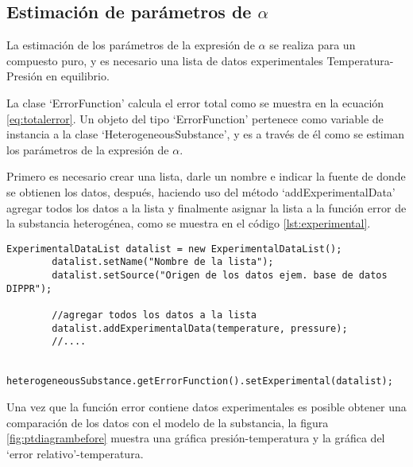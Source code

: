 \subsection{Estimación de parámetros de $\alpha$}\label{subsec:alphaoptim}
	La estimación de los parámetros de la expresión de $\alpha$ se realiza para un compuesto puro, y es necesario una lista de datos experimentales Temperatura-Presión en equilibrio. 

	La clase `ErrorFunction' calcula el error total como se muestra en la ecuación \ref{eq:totalerror}. Un objeto del tipo `ErrorFunction' pertenece como variable de instancia a la clase `HeterogeneousSubstance', y es a través de él como se estiman los parámetros de la expresión de $\alpha$.

	Primero es necesario crear una lista, darle un nombre e indicar la fuente de donde se obtienen los datos, después, haciendo uso del método `addExperimentalData' agregar todos los datos a la lista y finalmente asignar la lista a la función error de la substancia heterogénea, como se muestra en el código \ref{lst:experimental}.

	\begin{lstlisting}[label={lst:experimental},caption={Creación de una lista de datos experimentales presión-temperatura con la clase `ExperimentalDataList'}]
		ExperimentalDataList datalist = new ExperimentalDataList();
		datalist.setName("Nombre de la lista");
		datalist.setSource("Origen de los datos ejem. base de datos DIPPR");

		//agregar todos los datos a la lista
		datalist.addExperimentalData(temperature, pressure);
		//....

		heterogeneousSubstance.getErrorFunction().setExperimental(datalist);
	\end{lstlisting}

	Una vez que la función error contiene datos experimentales es posible obtener una comparación de los datos con el modelo de la substancia, la figura \ref{fig:ptdiagrambefore} muestra una gráfica presión-temperatura y la gráfica del `error relativo'-temperatura.


